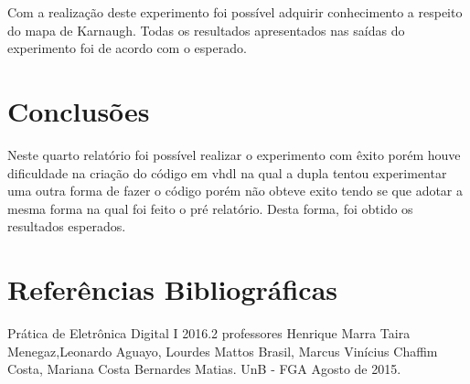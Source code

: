 \documentclass[12pts]{article}
\begin{document}
Com a realização deste experimento foi possível adquirir conhecimento a respeito do mapa de Karnaugh. Todas os resultados apresentados nas saídas do experimento foi de acordo com o esperado.

\section{Conclusões}

Neste quarto relatório foi possível realizar o experimento com êxito porém houve dificuldade na criação do código em vhdl na qual a dupla tentou experimentar uma outra forma de fazer o código porém não obteve exito tendo se que adotar a mesma forma na qual foi feito o pré relatório. Desta forma, foi obtido os resultados esperados.



\section{Referências Bibliográficas}

Prática de Eletrônica Digital I 2016.2 professores Henrique Marra Taira Menegaz,Leonardo Aguayo, Lourdes Mattos Brasil, Marcus Vinícius Chaffim Costa, Mariana Costa Bernardes Matias. UnB - FGA Agosto de 2015.

\newpage
\end{document}
